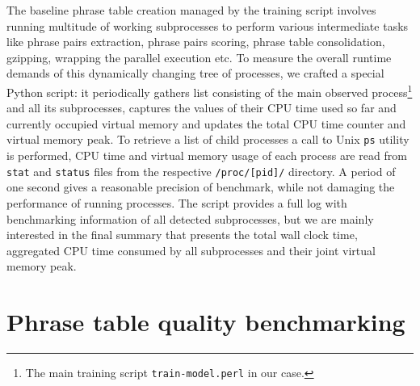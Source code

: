 
The baseline phrase table creation managed by the training script involves
running multitude of working subprocesses to perform various intermediate
tasks like phrase pairs extraction, phrase pairs scoring, phrase table
consolidation, gzipping, wrapping the parallel execution etc.
To measure the overall runtime demands of this dynamically changing tree
of processes, we crafted a special Python script:
it periodically gathers list consisting of the main observed process\footnote{The main training script \texttt{train-model.perl} in our case.}
and all its subprocesses, captures the values of their CPU time used so far
and currently occupied virtual memory and updates the total CPU time counter
and virtual memory peak.
To retrieve a list of child processes a call to Unix \verb|ps| utility is
performed, CPU time and virtual memory usage of each process are read from
\verb|stat| and \verb|status| files from the respective \verb|/proc/[pid]/|
directory.
A period of one second gives a reasonable precision of benchmark, while
not damaging the performance of running processes.
The script provides a full log with benchmarking information of all detected
subprocesses, but we are mainly interested in the final summary that presents
the total wall clock time, aggregated CPU time consumed by all subprocesses
and their joint virtual memory peak.

\section{Phrase table quality benchmarking}

